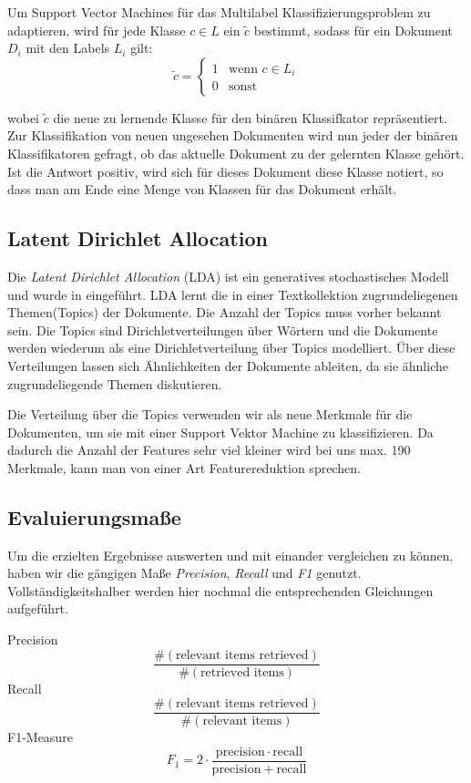 Um Support Vector Machines für das Multilabel Klassifizierungsproblem zu adaptieren, wird für jede Klasse $c \in L$ ein $\tilde c$ bestimmt, sodass für ein Dokument $D_i$ mit den Labels $L_i$ gilt:
\[
    \tilde c =
    \begin{cases}
        1 &\mbox{wenn } c \in L_i \\
        0 &\mbox{sonst}
    \end{cases}
\]

wobei $\tilde c$ die neue zu lernende Klasse für den binären Klassifkator repräsentiert.
Zur Klassifikation von neuen ungesehen Dokumenten wird nun jeder der binären Klassifikatoren gefragt, ob das aktuelle Dokument zu der gelernten Klasse gehört.
Ist die Antwort positiv, wird sich für dieses Dokument diese Klasse notiert, so dass man am Ende eine Menge von Klassen für das Dokument erhält.


\subsection{Latent Dirichlet Allocation}
\label{sub:latent_dirichlet_allocation}

Die \emph{Latent Dirichlet Allocation} (LDA) ist ein generatives stochastisches Modell und wurde in \cite{Blei:2003:LDA:944919.944937} eingeführt.
LDA lernt die in einer Textkollektion zugrundeliegenen Themen(Topics) der Dokumente. Die Anzahl der Topics muss vorher bekannt sein.
Die Topics sind Dirichletverteilungen über Wörtern und die Dokumente werden wiederum als eine Dirichletverteilung über Topics modelliert.
Über diese Verteilungen lassen sich Ähnlichkeiten der Dokumente ableiten, da sie ähnliche zugrundeliegende Themen diskutieren.

Die Verteilung über die Topics verwenden wir als neue Merkmale für die Dokumenten, um sie mit einer Support Vektor Machine zu klassifizieren.
Da dadurch die Anzahl der Features sehr viel kleiner wird bei uns max. 190 Merkmale, kann man von einer Art Featurereduktion sprechen.

\subsection{Evaluierungsmaße}
Um die erzielten Ergebnisse auswerten und mit einander vergleichen zu können, haben wir die gängigen Maße \emph{Precision}, \emph{Recall} und \emph{F1} genutzt.
Vollständigkeitshalber werden hier nochmal die entsprechenden Gleichungen aufgeführt.

Precision \[\frac{\#(\text{relevant items retrieved})}{\#(\text{retrieved items})}\]
Recall \[\frac{\#(\text{relevant items retrieved})}{\#(\text{relevant items})}\]
F1-Measure \[F_1 = 2 \cdot \frac{\mathrm{precision} \cdot \mathrm{recall}}{\mathrm{precision} + \mathrm{recall}}\]

